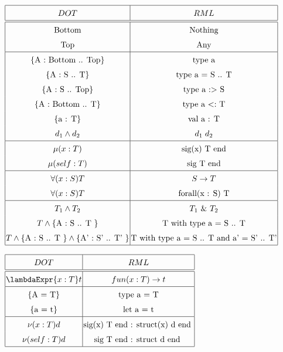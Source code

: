 \begin{center}
$\arraycolsep=1.0pt\def\arraystretch{1.5}
\begin{array}{|c|c|}
  \hline
  DOT & RML \\
  \hline \hline
  \text{Bottom} & \text{Nothing} \\
  \text{Top} & \text{Any} \\
  \hline
  \left\{ \text{A : Bottom .. Top} \right\} & \text{type a} \\
  \left\{ \text{A : S .. T} \right\} & \text{type a = S  .. T} \\
  \left\{ \text{A : S .. Top} \right\} & \text{type a $:>$ S} \\
  \left\{ \text{A : Bottom .. T} \right\} & \text{type a $<:$ T} \\
  \left\{ \text{a : T} \right\} & \text{val a : T} \\
  d_{1} \wedge d_{2} & d_{1} \; d_{2} \\
  \hline
  \mu(x : T) & \text{sig(x) T end} \\
  \mu(self : T) & \text{sig T end} \\
  \hline
  \forall(x : S) T & S \rightarrow T \\
  \forall(x : S) T & \text{forall(x : S) T} \\
  \hline
  T_{1} \wedge T_{2} & T_{1} \text{ \& } T_{2} \\
  T \wedge \left\{ \text{A : S .. T } \right\} & \text{T with type a = S .. T} \\
  T \wedge \left\{ \text{A : S .. T } \right\} \wedge \left\{ \text{A' : S' ..
  T' } \right\} & \text{T with type a = S .. T and a' = S' .. T'} \\
  \hline
\end{array}
$
\end{center}

\begin{center}
$\arraycolsep=1.0pt\def\arraystretch{1.5}
\begin{array}{|c|c|}
  \hline
  DOT & RML \\
  \hline \hline
  \lambdaExpr{x : T} t & fun(x : T) \rightarrow t \\
  \hline
  \left\{ \text{A = T} \right\} & \text{type a = T} \\
  \left\{ \text{a = t} \right\} & \text{let a = t} \\
  \hline
  \nu(x : T) d & \text{sig(x) T end : struct(x) d end } \\
  \nu(self : T) d & \text{sig T end : struct d end } \\
  \hline
\end{array}
$
\end{center}

